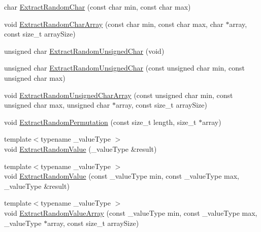 \begin{DoxyCompactItemize}
char \hyperlink{classcmn_random_sequence_a775b56e7925b8261f5704b4b65ef698c}{Extract\+Random\+Char} (const char min, const char max)
\item 
void \hyperlink{classcmn_random_sequence_a1cdb0f1ac5d1e9a9776efbc17c597b99}{Extract\+Random\+Char\+Array} (const char min, const char max, char $\ast$array, const size\+\_\+t array\+Size)
\item 
unsigned char \hyperlink{classcmn_random_sequence_a262f75d0fb6c781bcafff194cc928362}{Extract\+Random\+Unsigned\+Char} (void)
\item 
unsigned char \hyperlink{classcmn_random_sequence_a8d57f970f3e1f418bc24b5f649dd91c3}{Extract\+Random\+Unsigned\+Char} (const unsigned char min, const unsigned char max)
\item 
void \hyperlink{classcmn_random_sequence_a1590899b28b97214e2d366242a4cb49d}{Extract\+Random\+Unsigned\+Char\+Array} (const unsigned char min, const unsigned char max, unsigned char $\ast$array, const size\+\_\+t array\+Size)
\item 
void \hyperlink{classcmn_random_sequence_a4c26cb9a2036319501d9b4b282759945}{Extract\+Random\+Permutation} (const size\+\_\+t length, size\+\_\+t $\ast$array)
\end{DoxyCompactItemize}
{\bf }\par
\begin{DoxyCompactItemize}
\item 
{\footnotesize template$<$typename \+\_\+value\+Type $>$ }\\void \hyperlink{classcmn_random_sequence_a9ceb160824285f8c4ce757f81a96dbc9}{Extract\+Random\+Value} (\+\_\+value\+Type \&result)
\item 
{\footnotesize template$<$typename \+\_\+value\+Type $>$ }\\void \hyperlink{classcmn_random_sequence_a40b78b52ea3b774b081af0cce7db4203}{Extract\+Random\+Value} (const \+\_\+value\+Type min, const \+\_\+value\+Type max, \+\_\+value\+Type \&result)
\item 
{\footnotesize template$<$typename \+\_\+value\+Type $>$ }\\void \hyperlink{classcmn_random_sequence_af235d6abab889eadcbc260ffa9c69169}{Extract\+Random\+Value\+Array} (const \+\_\+value\+Type min, const \+\_\+value\+Type max, \+\_\+value\+Type $\ast$array, const size\+\_\+t array\+Size)
\end{DoxyCompactItemize}

